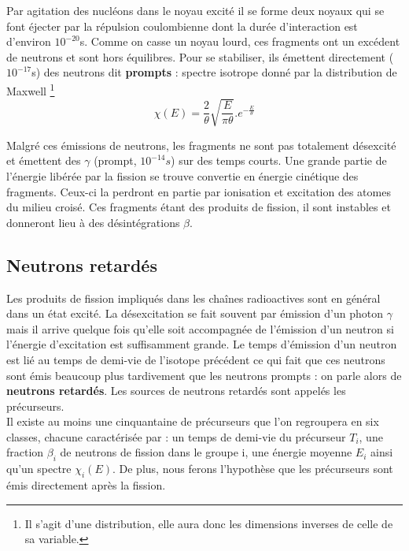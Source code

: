 Par agitation des nucléons dans le noyau excité il se forme deux noyaux qui se font éjecter par 
la répulsion coulombienne dont la durée d'interaction est d'environ $10^{-20}$s. Comme on casse un noyau lourd, ces fragments ont un 
excédent de neutrons et sont hors équilibres. Pour se stabiliser, ils émettent directement 
($10^{-17}$s) des neutrons dit \textbf{prompts} : spectre isotrope donné par la distribution de Maxwell
\footnote{Il s'agit d'une distribution, elle aura donc les dimensions inverses de celle de sa variable.}
\begin{equation}
\chi (E) = \frac{2}{\theta }\sqrt {\frac{E}{{\pi \theta }}} .{e^{ - \frac{E}{\theta }}}
\end{equation}

Malgré ces émissions de neutrons, les fragments ne sont pas totalement désexcité et émettent 
des $\gamma$ (prompt, $10^{-14}s$) sur des temps courts.
Une grande partie de l'énergie libérée par la fission se trouve convertie en énergie cinétique
des fragments. Ceux-ci la perdront en partie par ionisation et excitation des atomes du milieu
croisé. Ces fragments étant des produits de fission, il sont instables et donneront lieu à des
désintégrations $\beta$.


\subsection{Neutrons retardés}
Les produits de fission impliqués dans les chaînes radioactives sont en général dans un
état excité. La désexcitation se fait souvent par émission d'un photon $\gamma$ mais il
arrive quelque fois qu'elle soit accompagnée de l'émission d'un neutron si l'énergie
d'excitation est suffisamment grande.
Le temps d'émission d'un neutron est lié au temps de demi-vie de l'isotope précédent
ce qui fait que ces neutrons sont émis beaucoup plus tardivement que les neutrons prompts :
on parle alors de \textbf{neutrons retardés}.
Les sources de neutrons retardés sont appelés les précurseurs.\\

Il existe au moins une cinquantaine de précurseurs que l'on regroupera en six classes, chacune
caractérisée par : un temps de demi-vie du précurseur $T_i$, une fraction $\beta_i$ de neutrons
de fission dans le groupe i, une énergie moyenne $E_i$ ainsi qu'un spectre $\chi_i(E)$.
De plus, nous ferons l'hypothèse que les précurseurs sont émis directement après la fission.

